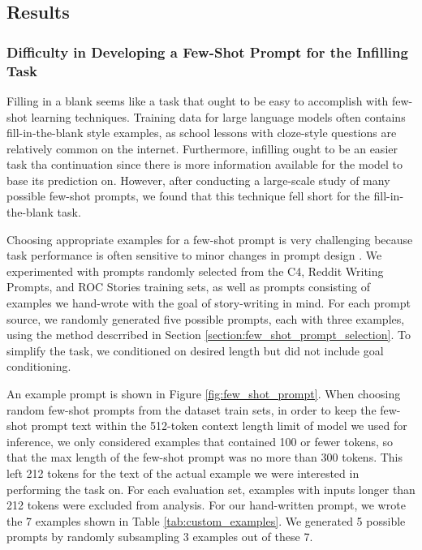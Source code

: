 \subsection{Results}
\subsubsection{Difficulty in Developing a Few-Shot Prompt for the Infilling Task}
Filling in a blank seems like a task that ought to be easy to accomplish with few-shot learning techniques.
Training data for large language models often contains fill-in-the-blank style examples, as school lessons with cloze-style questions are relatively common on the internet.
Furthermore, infilling ought to be an easier task tha continuation since there is more information available for the model to base its prediction on.
However, after conducting a large-scale study of many possible few-shot prompts, we found that this technique fell short for the fill-in-the-blank task.


Choosing appropriate examples for a few-shot prompt is very challenging because task performance is often sensitive to minor changes in prompt design \citep{zhao2021calibrate}.
We experimented with prompts randomly selected from the C4, Reddit Writing Prompts, and ROC Stories training sets, as well as prompts consisting of examples we hand-wrote with the goal of story-writing in mind.
For each prompt source, we randomly generated five possible prompts, each with three examples, using the method descrribed in Section \ref{section:few_shot_prompt_selection}.
To simplify the task, we conditioned on desired length but did not include goal conditioning.

An example prompt is shown in Figure \ref{fig:few_shot_prompt}.
When choosing random few-shot prompts from the dataset train sets, in order to keep the few-shot prompt text within the 512-token context length limit of model we used for inference, we only considered examples that contained 100 or fewer tokens, so that the max length of the few-shot prompt was no more than 300 tokens.
This left 212 tokens for the text of the actual example we were interested in performing the \FitB{} task on.
For each evaluation set, examples with inputs longer than 212 tokens were excluded from analysis.
For our hand-written prompt, we wrote the 7 examples shown in Table \ref{tab:custom_examples}.
We generated 5 possible prompts by randomly subsampling 3 examples out of these 7.


